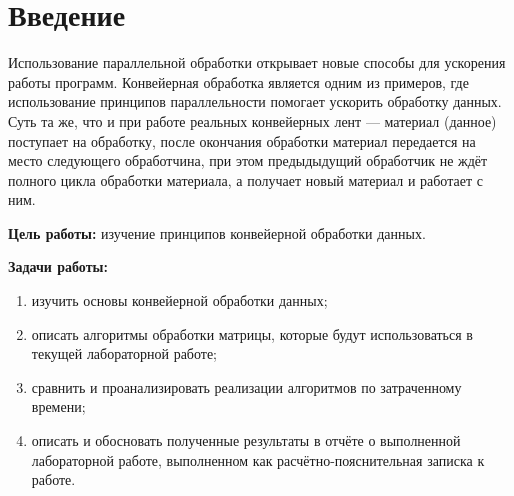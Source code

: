 \chapter*{Введение}

Использование параллельной обработки открывает новые способы для
ускорения работы программ.
Конвейерная обработка является одним из примеров, где использование принципов параллельности помогает ускорить обработку данных. 
Суть та же, что и при работе реальных конвейерных лент --- материал (данное) поступает на обработку, после окончания обработки материал передается на место следующего обработчина, при этом предыдыдущий обработчик не ждёт полного цикла обработки материала, а получает новый материал и работает с ним.


\textbf{Цель работы:} изучение принципов конвейерной обработки данных.

\textbf{Задачи работы:}
\begin{enumerate}[label=\arabic*)]
	\item изучить основы конвейерной обработки данных;
	\item описать алгоритмы обработки матрицы, которые будут использоваться в текущей лабораторной работе;
	\item сравнить и проанализировать реализации алгоритмов по затраченному времени;
	\item описать и обосновать полученные результаты в отчёте о выполненной лабораторной работе, выполненном как расчётно-пояснительная записка к работе.
\end{enumerate}
